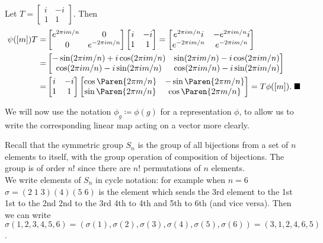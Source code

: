 \begin{proo*}
	Let $T = \begin{bmatrix}i & -i\\1 & 1\end{bmatrix}$. Then
\begin{align*}	
	\psi([m])T = &\begin{bmatrix}e^{2 \pi i m/n} & 0 \\\ 0 & e^{-2 \pi i m/n}\end{bmatrix} \begin{bmatrix}i & -i\\1 & 1\end{bmatrix} = \begin{bmatrix}e^{2 \pi i m/n}i & -e^{2 \pi i m/n}i \\ e^{-2 \pi i m/n} & e^{-2 \pi i m/n}\end{bmatrix}\\ = &\begin{bmatrix}-\sin(2\pi i m/n) + i\cos(2\pi i m/n) & \sin(2\pi i m/n) - i\cos(2\pi i m/n)\\ \cos(2\pi i m/n) - i \sin(2\pi i m/n) & \cos(2\pi i m/n) - i \sin(2\pi i m/n)\end{bmatrix}\\
	= & \begin{bmatrix}i & -i\\1 & 1\end{bmatrix}\begin{bmatrix}\cos\Paren{{2 \pi m}/{n}} & -\sin\Paren{{2 \pi m}/{n}}\\ \sin\Paren{{2 \pi m}/{n}} & \cos\Paren{{2 \pi m}/{n}}\end{bmatrix} =  T\phi([m]).\; \blacksquare
\end{align*}
\end{proo*}

We will now use the notation $\phi_g \coloneqq \phi(g)$ for a representation $\phi$, to allow us to write the corresponding linear map acting on a vector more clearly.

\begin{defi}
	Recall that the symmetric group $S_n$ is the group of all bijections from a set of $n$ elements to itself, with the group operation of composition of bijections. The group is of order $n!$ since there are $n!$ permutations of $n$ elements.\\

	We write elements of $S_n$ in cycle notation: for example when $n=6$\; $\sigma = (2\;1\;3)(4)(5\;6)$ is the element which sends the $3$rd element to the 1st\; 1st to the 2nd\; 2nd to the 3rd\; 4th to 4th\; and 5th to 6th (and vice versa). Then we can write
	$\sigma(1,2,3,4,5,6) = (\sigma(1),\sigma(2),\sigma(3),\sigma(4),\sigma(5),\sigma(6)) = (3,1,2,4,6,5)$.
\end{defi}

